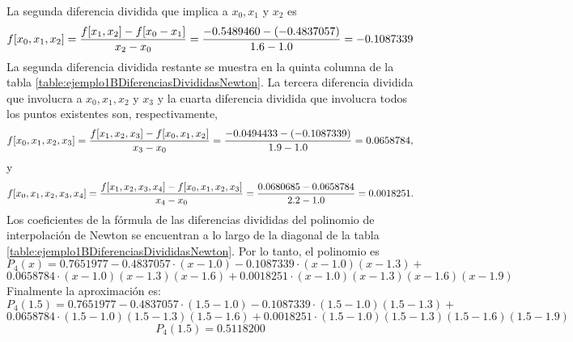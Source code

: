\begin{example}
{	La segunda diferencia dividida que implica a $x_0, x_1$ y $x_2$ es
	$$f[x_0,x_1,x_2] = {f[x_1,x_2]-f[x_0-x_1]\over x_2-x_0} = {-0.5489460-(-0.4837057)\over 1.6 - 1.0} = -0.1087339$$
	La segunda diferencia dividida restante se muestra en la quinta columna de la tabla \ref{table:ejemplo1BDiferenciasDivididasNewton}. La tercera diferencia
	dividida que involucra a $x_0, x_1, x_2$ y $x_3$ y la cuarta diferencia dividida que involucra todos los puntos existentes son, respectivamente,
	$$f[x_0,x_1,x_2,x_3] = {f[x_1,x_2,x_3]-f[x_0,x_1,x_2]\over x_3-x_0} = {-0.0494433-(-0.1087339)\over 1.9-1.0} = 0.0658784,$$
	y
	$$f[x_0,x_1,x_2,x_3,x_4] = {f[x_1,x_2,x_3,x_4]-f[x_0,x_1,x_2,x_3]\over x_4-x_0} = {0.0680685-0.0658784\over 2.2-1.0} = 0.0018251.$$
	Los coeficientes de la fórmula de las diferencias divididas del polinomio de interpolación de Newton se encuentran a lo largo de la diagonal 
	de la tabla \ref{table:ejemplo1BDiferenciasDivididasNewton}. Por lo tanto, el polinomio es
	$$P_4(x) = 0.7651977 - 0.4837057\cdot(x-1.0) - 0.1087339\cdot(x-1.0)(x-1.3) + $$
	$$0.0658784\cdot(x-1.0)(x-1.3)(x-1.6) + 0.0018251\cdot(x-1.0)(x-1.3)(x-1.6)(x-1.9)$$
	Finalmente la aproximación es:
	$$P_4(1.5) = 0.7651977 - 0.4837057\cdot(1.5-1.0) - 0.1087339\cdot(1.5-1.0)(1.5-1.3) + $$
	$$0.0658784\cdot(1.5-1.0)(1.5-1.3)(1.5-1.6) + 0.0018251\cdot(1.5-1.0)(1.5-1.3)(1.5-1.6)(1.5-1.9)$$
	$$P_4(1.5) = 0.5118200$$ 
}\end{example}
\hrulefill\\

